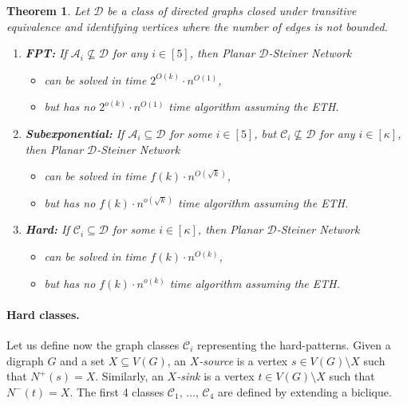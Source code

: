\documentclass[a4paper,11pt]{article}
\newcommand{\calD}{\mathcal{D}}
\theoremstyle{plain}
\newtheorem{theorem}{Theorem}[section]
\newtheorem{identification rule}{Identification Rule}
\theoremstyle{definition}
\theoremstyle{remark}
\newcommand{\Dsnfull}{{\sc Planar $\calD$-Steiner Network}\xspace}
\newcommand{\oldC}{\mathcal{A}}
\begin{document}
\begin{mdframed}[style=highlight,frametitle={Our main result}] 

\begin{theorem}\label{thm:main-intro}
  Let $\calD$ be a class of directed graphs closed under transitive equivalence and identifying vertices where the number of edges is not bounded.
  \begin{enumerate}
  \item \textbf{FPT:}   If $\oldC_i\not\subseteq \calD$ for any $i\in [5]$, then \Dsnfull
    \begin{itemize}
    \item[(i)] can be solved in time $2^{O(k)}\cdot n^{O(1)}$,
    \item[(ii)] but has no $2^{o(k)}\cdot n^{O(1)}$ time algorithm assuming the ETH.
    \end{itemize}
  \item \textbf{Subexponential:}   If $\oldC_i\subseteq\calD$ for some $i\in [5]$, but $\mathcal{C}_i\not\subseteq \calD$ for any $i\in[\kappa]$, then \Dsnfull
    \begin{itemize}
    \item[(iii)] can be solved in time $f(k) \cdot n^{O(\sqrt{k})}$,
      \item[(iv)] but has no
        $f(k) \cdot n^{o(\sqrt{k})}$ time algorithm assuming the ETH.
      \end{itemize}
    \item \textbf{Hard:} If $\mathcal{C}_i\subseteq \calD$ for some $i\in [\kappa]$, then \Dsnfull
      \begin{itemize}
      \item[(v)]  can be solved in time $f(k)\cdot n^{O({k})}$,
        \item[(vi)] but has no $f(k) \cdot n^{o({k})}$ time algorithm assuming the ETH.
        \end{itemize}
      \end{enumerate}
    \end{theorem}

  \end{mdframed}

\paragraph{Hard classes.}
Let us define now the graph classes $\mathcal{C}_i$ representing the hard-patterns. Given a digraph $G$ and a set $X \subseteq V(G)$, an \emph{$X$-source} is a vertex $s \in V(G) \setminus X$ such that $N^+(s) = X$.
Similarly, an \emph{$X$-sink} is a vertex $t \in V(G) \setminus X$ such that $N^-(t) = X$.
The first 4 classes $\mathcal{C}_1$, $\dots$, $\mathcal{C}_4$ are defined by extending a biclique.
\end{document}
